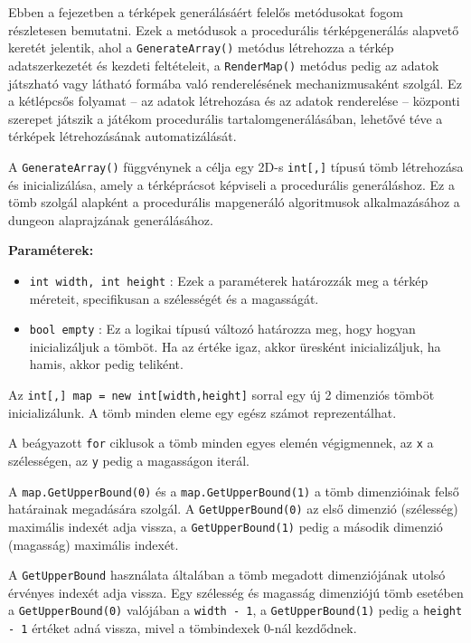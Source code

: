 
Ebben a fejezetben a térképek generálásáért felelős metódusokat fogom részletesen bemutatni. Ezek a metódusok a procedurális térképgenerálás alapvető keretét jelentik, ahol a \texttt{GenerateArray()} metódus létrehozza a térkép adatszerkezetét és kezdeti feltételeit, a \texttt{RenderMap()} metódus pedig az adatok játszható vagy látható formába való renderelésének mechanizmusaként szolgál. Ez a kétlépcsős folyamat -- az adatok létrehozása és az adatok renderelése -- központi szerepet játszik a játékom procedurális tartalomgenerálásában, lehetővé téve a térképek létrehozásának automatizálását.


A \texttt{GenerateArray()} függvénynek a célja egy 2D-s \texttt{int[,]} típusú tömb létrehozása és inicializálása, amely a térképrácsot képviseli a procedurális generáláshoz. Ez a tömb szolgál alapként a procedurális mapgeneráló algoritmusok alkalmazásához a dungeon alaprajzának generálásához.

\textbf{Paraméterek:}
\begin{itemize}
\item \texttt{int width, int height} : Ezek a paraméterek határozzák meg a térkép méreteit, specifikusan a szélességét és a magasságát.
\item \texttt{bool empty} : Ez a logikai típusú változó határozza meg, hogy hogyan inicializáljuk a tömböt. Ha az értéke igaz, akkor üresként inicializáljuk, ha hamis, akkor pedig teliként.
\end{itemize}

Az \texttt{int[,] map = new int[width,height]} sorral egy új 2 dimenziós tömböt inicializálunk. A tömb minden eleme egy egész számot reprezentálhat.

A beágyazott \texttt{for} ciklusok a tömb minden egyes elemén végigmennek, az \texttt{x} a szélességen, az \texttt{y} pedig a magasságon iterál.

 A \texttt{map.GetUpperBound(0)} és a \texttt{map.GetUpperBound(1)} a tömb dimenzióinak felső határainak megadására szolgál. A \texttt{GetUpperBound(0)} az első dimenzió (szélesség) maximális indexét adja vissza, a \texttt{GetUpperBound(1)} pedig a második dimenzió (magasság) maximális indexét.

A \texttt{GetUpperBound} használata általában a tömb megadott dimenziójának utolsó érvényes indexét adja vissza. Egy szélesség és magasság dimenziójú tömb esetében a \texttt{GetUpperBound(0)} valójában a \texttt{width - 1}, a \texttt{GetUpperBound(1)} pedig a \texttt{height - 1} értéket adná vissza, mivel a tömbindexek 0-nál kezdődnek.


